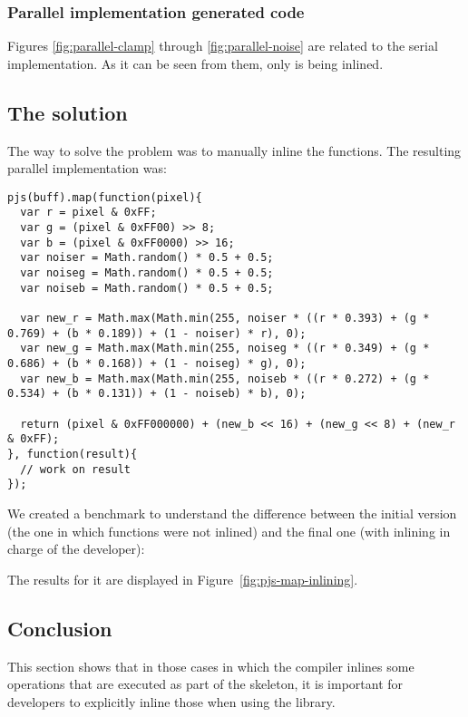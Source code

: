 \subsubsection{Parallel implementation generated code}
Figures \ref{fig:parallel-clamp} through \ref{fig:parallel-noise} are related to the serial implementation. As it can be seen from them, only  is being inlined.

\subsection{The solution}
The way to solve the problem was to manually inline the functions. The resulting parallel implementation was:
\begin{lstlisting}[caption=Sepia tone final parallel implementation]
pjs(buff).map(function(pixel){
  var r = pixel & 0xFF;
  var g = (pixel & 0xFF00) >> 8;
  var b = (pixel & 0xFF0000) >> 16;
  var noiser = Math.random() * 0.5 + 0.5;
  var noiseg = Math.random() * 0.5 + 0.5;
  var noiseb = Math.random() * 0.5 + 0.5;

  var new_r = Math.max(Math.min(255, noiser * ((r * 0.393) + (g * 0.769) + (b * 0.189)) + (1 - noiser) * r), 0);
  var new_g = Math.max(Math.min(255, noiseg * ((r * 0.349) + (g * 0.686) + (b * 0.168)) + (1 - noiseg) * g), 0);
  var new_b = Math.max(Math.min(255, noiseb * ((r * 0.272) + (g * 0.534) + (b * 0.131)) + (1 - noiseb) * b), 0);

  return (pixel & 0xFF000000) + (new_b << 16) + (new_g << 8) + (new_r & 0xFF);
}, function(result){
  // work on result
});
\end{lstlisting}

We created a benchmark to understand the difference between the initial version (the one in which functions were not inlined) and the final one (with inlining in charge of the developer):

The results for it are displayed in Figure~\ref{fig:pjs-map-inlining}.

\subsection{Conclusion}
This section shows that in those cases in which the compiler inlines some operations that are executed as part of the skeleton, it is important for developers to explicitly inline those when using the library.

\pagebreak
